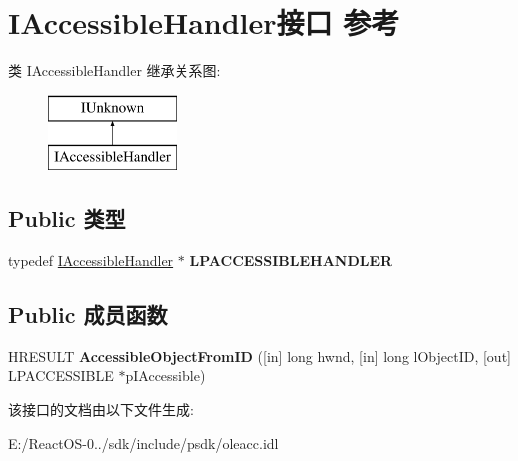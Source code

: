 \hypertarget{interface_i_accessible_handler}{}\section{I\+Accessible\+Handler接口 参考}
\label{interface_i_accessible_handler}
类 I\+Accessible\+Handler 继承关系图\+:\begin{figure}[H]
\begin{center}
\leavevmode
\includegraphics[height=2.000000cm]{interface_i_accessible_handler}
\end{center}
\end{figure}
\subsection*{Public 类型}
\begin{DoxyCompactItemize}
\item 
\mbox{\label{interface_i_accessible_handler_a5852279fe80d0f0f1075f4d3a22879f5}} 
typedef \hyperlink{interface_i_accessible_handler}{I\+Accessible\+Handler} $\ast$ {\bfseries L\+P\+A\+C\+C\+E\+S\+S\+I\+B\+L\+E\+H\+A\+N\+D\+L\+ER}
\end{DoxyCompactItemize}
\subsection*{Public 成员函数}
\begin{DoxyCompactItemize}
\item 
\mbox{\label{interface_i_accessible_handler_a4e5e4f0e50ead4b4441b51b42f55e33b}} 
H\+R\+E\+S\+U\+LT {\bfseries Accessible\+Object\+From\+ID} (\mbox{[}in\mbox{]} long hwnd, \mbox{[}in\mbox{]} long l\+Object\+ID, \mbox{[}out\mbox{]} L\+P\+A\+C\+C\+E\+S\+S\+I\+B\+LE $\ast$p\+I\+Accessible)
\end{DoxyCompactItemize}


该接口的文档由以下文件生成\+:\begin{DoxyCompactItemize}
\item 
E\+:/\+React\+O\+S-\/0../sdk/include/psdk/oleacc.\+idl\end{DoxyCompactItemize}
